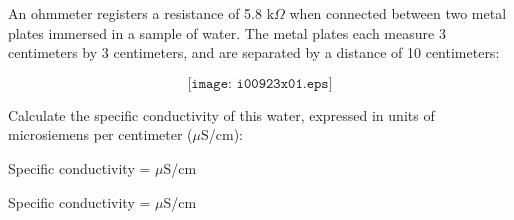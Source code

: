 

An ohmmeter registers a resistance of 5.8 k$\Omega$ when connected between two metal plates immersed in a sample of water.  The metal plates each measure 3 centimeters by 3 centimeters, and are separated by a distance of 10 centimeters:

$$\texttt{[image: i00923x01.eps]}$$

Calculate the specific conductivity of this water, expressed in units of microsiemens per centimeter ($\mu$S/cm):

\vskip 10pt

Specific conductivity = \underbar{\hskip 50pt} $\mu$S/cm







Specific conductivity =  $\mu$S/cm










